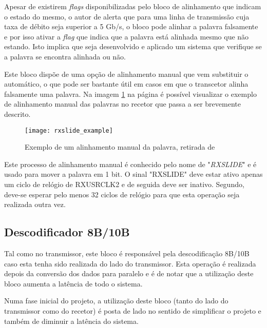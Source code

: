 Apesar de existirem \textit{flags} disponibilizadas pelo bloco de alinhamento que indicam o estado do mesmo, o autor de \cite{R011} alerta que para uma linha de transmissão cuja taxa de débito seja superior a 5 Gb/s, o bloco pode alinhar a palavra falsamente e por isso ativar a \textit{flag} que indica que a palavra está alinhada mesmo que não estando. Isto implica que seja desenvolvido e aplicado um sistema que verifique se a palavra se encontra alinhada ou não.


Este bloco dispõe de uma opção de alinhamento manual que vem substituir o automático, o que pode ser bastante útil em casos em que o transcetor alinha falsamente uma palavra. Na imagem \ref{fig:rxslide_example} na página \pageref{fig:rxslide_example} é possível visualizar o exemplo de alinhamento manual das palavras no recetor que passa a ser brevemente descrito.

\begin{figure}[h!]
	\begin{center}
		\leavevmode
		\texttt{[image: rxslide\_example]}
		\captionsetup{width=1.0\linewidth}
		\caption{Exemplo de um alinhamento manual da palavra, retirada de \cite{R011}}
		\label{fig:rxslide_example}
	\end{center}
\end{figure}

Este processo de alinhamento manual é conhecido pelo nome de "\textit{RXSLIDE}" e é usado para mover a palavra em 1 bit. O sinal "RXSLIDE" deve estar ativo apenas um ciclo de relógio de RXUSRCLK2 e de seguida deve ser inativo. Segundo, \cite{R011} deve-se esperar pelo menos 32 ciclos de relógio para que esta operação seja realizada outra vez.  

\subsection{Descodificador 8B/10B}

Tal como no transmissor, este bloco é responsável pela descodificação 8B/10B caso esta tenha sido realizada do lado do transmissor. Esta operação é realizada depois da conversão dos dados para paralelo e é de notar que a utilização deste bloco aumenta a latência de todo o sistema.

Numa fase inicial do projeto, a utilização deste bloco (tanto do lado do transmissor como do recetor) é posta de lado no sentido de simplificar o projeto e também de diminuir a latência do sistema.   

